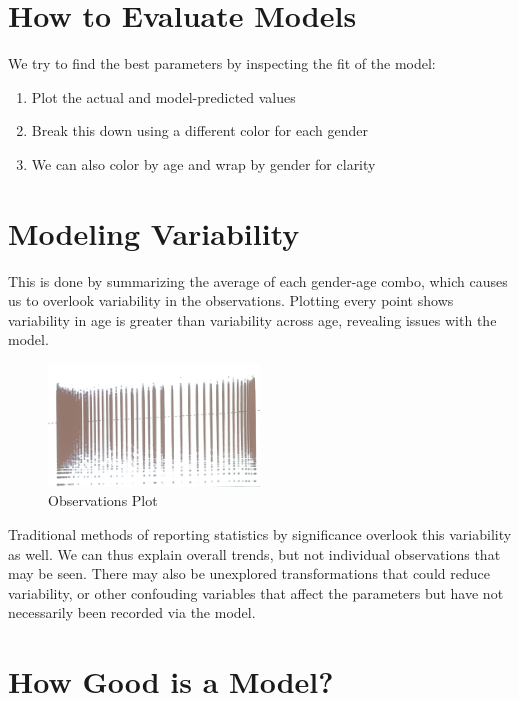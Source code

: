 
\section{How to Evaluate Models}

We try to find the best parameters by inspecting the fit of the model:
\begin{enumerate}
\item Plot the actual and model-predicted values 
\item Break this down using a different color for each gender
\item We can also color by age and wrap by gender for clarity
\end{enumerate}

\section{Modeling Variability}

This is done by summarizing the average of each gender-age combo, which causes us to overlook variability in the observations. Plotting every point shows variability in age is greater than variability across age, revealing issues with the model. 

\begin{figure}[h]
\begin{center}
\includegraphics[width=0.5\textwidth]{figures/figure1.jpg}
\caption{Observations Plot}
\end{center}
\end{figure}

Traditional methods of reporting statistics by significance overlook this variability as well. We can thus explain overall trends, but not individual observations that may be seen. There may also be unexplored transformations that could reduce variability, or other confouding variables that affect the parameters but have not necessarily been recorded via the model. 

\section{How Good is a Model?}

